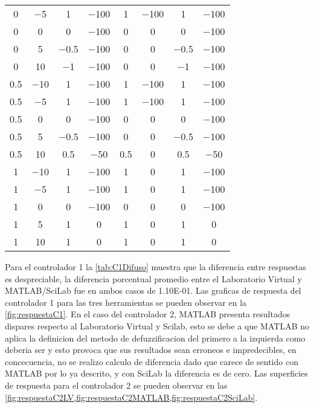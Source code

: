 {\begin{longtable}{c @{\extracolsep{\fill}} ccccccc}
        \num{0}    & \num{-5}  & \num{1}    & \num{-100} & \num{1}   & \num{-100} & \num{1}    & \num{-100}  \\
        \num{0}    & \num{0}   & \num{0}    & \num{-100} & \num{0}   & \num{0}    & \num{0}    & \num{-100}  \\
        \num{0}    & \num{5}   & \num{-0.5} & \num{-100} & \num{0}   & \num{0}    & \num{-0.5} & \num{-100}  \\
        \num{0}    & \num{10}  & \num{-1}   & \num{-100} & \num{0}   & \num{0}    & \num{-1}   & \num{-100}  \\
        \num{0.5}  & \num{-10} & \num{1}    & \num{-100} & \num{1}   & \num{-100} & \num{1}    & \num{-100}  \\
        \num{0.5}  & \num{-5}  & \num{1}    & \num{-100} & \num{1}   & \num{-100} & \num{1}    & \num{-100}  \\
        \num{0.5}  & \num{0}   & \num{0}    & \num{-100} & \num{0}   & \num{0}    & \num{0}    & \num{-100}  \\
        \num{0.5}  & \num{5}   & \num{-0.5} & \num{-100} & \num{0}   & \num{0}    & \num{-0.5} & \num{-100}  \\
        \num{0.5}  & \num{10}  & \num{0.5}  & \num{-50}  & \num{0.5} & \num{0}    & \num{0.5}  & \num{-50}   \\
        \num{1}    & \num{-10} & \num{1}    & \num{-100} & \num{1}   & \num{0}    & \num{1}    & \num{-100}  \\
        \num{1}    & \num{-5}  & \num{1}    & \num{-100} & \num{1}   & \num{0}    & \num{1}    & \num{-100}  \\
        \num{1}    & \num{0}   & \num{0}    & \num{-100} & \num{0}   & \num{0}    & \num{0}    & \num{-100}  \\
        \num{1}    & \num{5}   & \num{1}    & \num{0}    & \num{1}   & \num{0}    & \num{1}    & \num{0}     \\
        \num{1}    & \num{10}  & \num{1}    & \num{0}    & \num{1}   & \num{0}    & \num{1}    & \num{0}     \\
        \end{longtable}}

        Para el controlador 1 la \cref{tab:C1Difuso} muestra que la diferencia entre respuestas es despreciable, la diferencia porcentual promedio entre el Laboratorio Virtual y MATLAB/SciLab fue en ambos casos de \num{1.10E-01}. Las graficas de respuesta del controlador 1 para las tres herramientas se pueden observar en la \cref{fig:respuestaC1}. En el caso del controlador 2, MATLAB presenta resultados dispares respecto al Laboratorio Virtual y Scilab, esto se debe a que MATLAB no aplica la definicion del metodo de defuzzificacion del primero a la izquierda como deberia ser y esto provoca que sus resultados sean erroneos e impredecibles, en concecuencia, no se realizo calculo de diferencia dado que carece de sentido con MATLAB por lo ya descrito, y con SciLab la diferencia es de cero. Las superficies de respuesta para el controlador 2 se pueden observar en las \cref{fig:respuestaC2LV,fig:respuestaC2MATLAB,fig:respuestaC2SciLab}.

